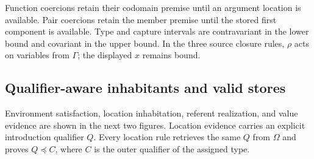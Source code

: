 \documentclass[acmsmall,screen,nonacm]{acmart}
\newcommand{\semleq}{\mathrel{\preceq}}
\newcommand{\rulesetup}{%
  \small
  \smallrulenames
  \setlength{\afterruleskip}{1.45em plus 0.2em minus 0.1em}%
  \setlength{\labelminsep}{0.65em}%
  \renewcommand{\arraystretch}{1.15}%
  \renewcommand{\andalso}{\qquad}%
}
\begin{document}
Function coercions retain their codomain premise until an argument location
is available.  Pair coercions retain the member premise until the stored
first component is available.  Type and capture intervals are contravariant
in the lower bound and covariant in the upper bound.  In the three source
closure rules, \(\rho\) acts on variables from \(\Gamma\); the displayed
\(x\) remains bound.

\subsection{Qualifier-aware inhabitants and valid stores}

Environment satisfaction, location inhabitation, referent realization, and
value evidence are shown in the next two figures.  Location evidence carries
an explicit introduction qualifier \(Q\).  Every location rule retrieves the
same \(Q\) from \(\Omega\) and proves \(Q\semleq C\), where \(C\) is the
outer qualifier of the assigned type.

\begingroup
\setlength{\abovedisplayskip}{5pt plus 1pt minus 1pt}
\setlength{\belowdisplayskip}{5pt plus 1pt minus 1pt}
\setlength{\intextsep}{5pt}
\captionsetup{skip=6pt}
\rulesetup
\end{document}
